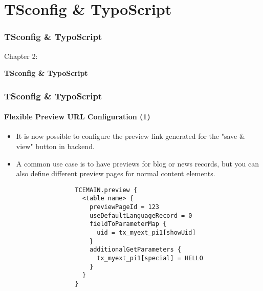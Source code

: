 %

\section{TSconfig \& TypoScript}
\begin{frame}[fragile]
	\frametitle{TSconfig \& TypoScript}

	\begin{center}\huge{Chapter 2:}\end{center}
	\begin{center}\huge{\color{typo3darkgrey}\textbf{TSconfig \& TypoScript}}\end{center}

\end{frame}

\begin{frame}[fragile]
	\frametitle{TSconfig \& TypoScript}
	\framesubtitle{Flexible Preview URL Configuration (1)}

	\lstset{basicstyle=\tiny\ttfamily}

	\begin{itemize}

		\item It is now possible to configure the preview link generated for the\newline
			"save \& view" button in backend.

		\item A common use case is to have previews for blog or news records, but you
			can also define different preview pages for normal content elements.

			\begin{lstlisting}
				TCEMAIN.preview {
				  <table name> {
				    previewPageId = 123
				    useDefaultLanguageRecord = 0
				    fieldToParameterMap {
				      uid = tx_myext_pi1[showUid]
				    }
				    additionalGetParameters {
				      tx_myext_pi1[special] = HELLO
				    }
				  }
				}
			\end{lstlisting}

	\end{itemize}

\end{frame}

